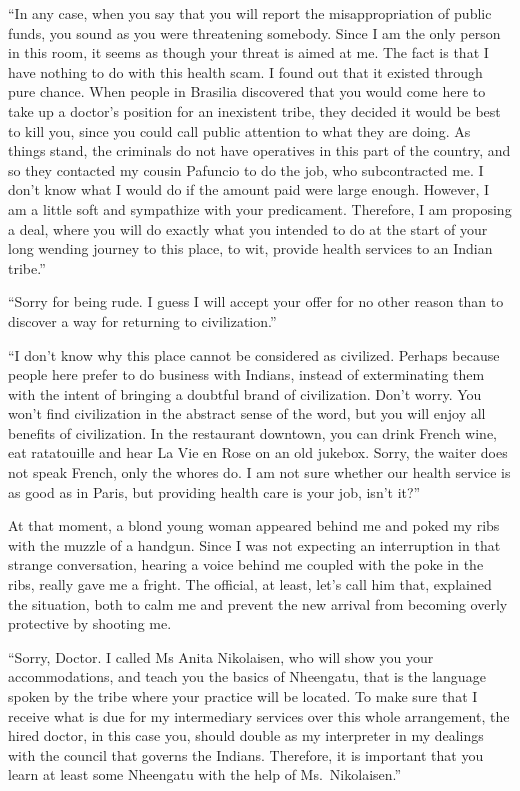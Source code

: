 \documentclass[
  12pt,
]{book}
\begin{document}
``In any case, when you say that you will report the misappropriation of
public funds, you sound as you were threatening somebody. Since I am the
only person in this room, it seems as though your threat is aimed at me.
The fact is that I have nothing to do with this health scam. I found out
that it existed through pure chance. When people in Brasilia discovered
that you would come here to take up a doctor's position for an
inexistent tribe, they decided it would be best to kill you, since you
could call public attention to what they are doing. As things stand, the
criminals do not have operatives in this part of the country, and so
they contacted my cousin Pafuncio to do the job, who subcontracted me. I
don't know what I would do if the amount paid were large enough.
However, I am a little soft and sympathize with your predicament.
Therefore, I am proposing a deal, where you will do exactly what you
intended to do at the start of your long wending journey to this place,
to wit, provide health services to an Indian tribe.''

``Sorry for being rude. I guess I will accept your offer for no other
reason than to discover a way for returning to civilization.''

``I don't know why this place cannot be considered as civilized. Perhaps
because people here prefer to do business with Indians, instead of
exterminating them with the intent of bringing a doubtful brand of
civilization. Don't worry. You won't find civilization in the abstract
sense of the word, but you will enjoy all benefits of civilization. In
the restaurant downtown, you can drink French wine, eat ratatouille and
hear La Vie en Rose on an old jukebox. Sorry, the waiter does not speak
French, only the whores do. I am not sure whether our health service is
as good as in Paris, but providing health care is your job, isn't it?''

At that moment, a blond young woman appeared behind me and poked my ribs
with the muzzle of a handgun. Since I was not expecting an interruption
in that strange conversation, hearing a voice behind me coupled with the
poke in the ribs, really gave me a fright. The official, at least, let's
call him that, explained the situation, both to calm me and prevent the
new arrival from becoming overly protective by shooting me.

``Sorry, Doctor. I called Ms Anita Nikolaisen, who will show you your
accommodations, and teach you the basics of Nheengatu, that is the
language spoken by the tribe where your practice will be located. To
make sure that I receive what is due for my intermediary services over
this whole arrangement, the hired doctor, in this case you, should
double as my interpreter in my dealings with the council that governs
the Indians. Therefore, it is important that you learn at least some
Nheengatu with the help of Ms.~Nikolaisen.''
\end{document}
